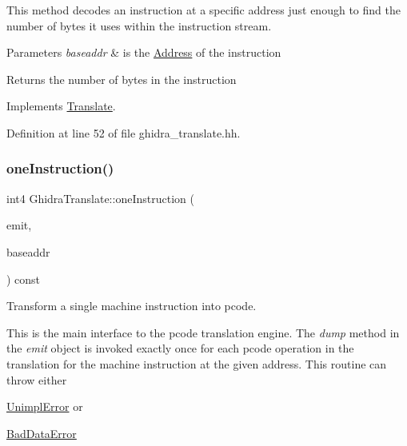 This method decodes an instruction at a specific address just enough to find the number of bytes it uses within the instruction stream. 
\begin{DoxyParams}{Parameters}
{\em baseaddr} & is the \mbox{\hyperlink{class_address}{Address}} of the instruction \\
\hline
\end{DoxyParams}
\begin{DoxyReturn}{Returns}
the number of bytes in the instruction 
\end{DoxyReturn}


Implements \mbox{\hyperlink{class_translate_aa7139376886fccfdcda529fc74f7b382}{Translate}}.



Definition at line 52 of file ghidra\+\_\+translate.\+hh.

\mbox{\label{class_ghidra_translate_aa78b3ea805b2fb69c7e4dc9e7d8f32ee}} 
\subsubsection{\texorpdfstring{oneInstruction()}{oneInstruction()}}
{\footnotesize\ttfamily int4 Ghidra\+Translate\+::one\+Instruction (\begin{DoxyParamCaption}\item[{\mbox{\hyperlink{class_pcode_emit}{Pcode\+Emit}} \&}]{emit,  }\item[{const \mbox{\hyperlink{class_address}{Address}} \&}]{baseaddr }\end{DoxyParamCaption}) const\hspace{0.3cm}{\ttfamily [virtual]}}



Transform a single machine instruction into pcode. 

This is the main interface to the pcode translation engine. The {\itshape dump} method in the {\itshape emit} object is invoked exactly once for each pcode operation in the translation for the machine instruction at the given address. This routine can throw either
\begin{DoxyItemize}
\item \mbox{\hyperlink{struct_unimpl_error}{Unimpl\+Error}} or
\item \mbox{\hyperlink{struct_bad_data_error}{Bad\+Data\+Error}}
\end{DoxyItemize}


